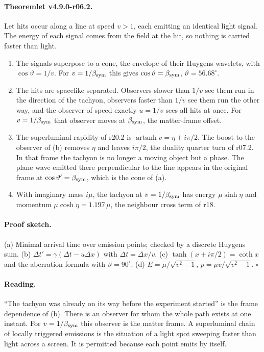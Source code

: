 \paragraph{Theoremlet v4.9.0-r06.2.}
Let hits occur along a line at speed \(v>1\), each emitting an identical light signal.  The energy of each signal comes
from the field at the hit, so nothing is carried faster than light.
\begin{enumerate}[leftmargin=2em]
\item[(a)] The signals superpose to a cone, the envelope of their Huygens wavelets, with \(\cos\vartheta=1/v\).  For
\(v=1/\beta_{\mathrm{sym}}\) this gives \(\cos\vartheta=\beta_{\mathrm{sym}}\), \(\vartheta=56.68^\circ\).
\item[(b)] The hits are spacelike separated.  Observers slower than \(1/v\) see them run in the direction of the
tachyon, observers faster than \(1/v\) see them run the other way, and the observer of speed exactly \(u=1/v\) sees all hits
at once.  For \(v=1/\beta_{\mathrm{sym}}\) that observer moves at \(\beta_{\mathrm{sym}}\), the matter-frame offset.
\item[(c)] The superluminal rapidity of r20.2 is \(\operatorname{artanh}v=\eta+i\pi/2\).  The boost to the observer of (b)
removes \(\eta\) and leaves \(i\pi/2\), the duality quarter turn of r07.2.  In that frame the tachyon is no longer a moving
object but a phase.  The plane wave emitted there perpendicular to the line appears in the original frame at
\(\cos\vartheta'=\beta_{\mathrm{sym}}\), which is the cone of (a).
\item[(d)] With imaginary mass \(i\mu\), the tachyon at \(v=1/\beta_{\mathrm{sym}}\) has energy \(\mu\sinh\eta\) and momentum
\(\mu\cosh\eta=1.197\,\mu\), the neighbour cross term of r18.
\end{enumerate}

\paragraph{Proof sketch.}
(a) Minimal arrival time over emission points; checked by a discrete Huygens sum.  (b)
\(\Delta t'=\gamma(\Delta t-u\Delta x)\) with \(\Delta t=\Delta x/v\).  (c) \(\tanh(x+i\pi/2)=\coth x\) and the aberration
formula with \(\vartheta=90^\circ\).  (d) \(E=\mu/\sqrt{v^2-1}\), \(p=\mu v/\sqrt{v^2-1}\).  \(\square\)

\paragraph{Reading.}
``The tachyon was already on its way before the experiment started'' is the frame dependence of (b).  There is an
observer for whom the whole path exists at one instant.  For \(v=1/\beta_{\mathrm{sym}}\) this observer is the matter frame.  A
superluminal chain of locally triggered emissions is the situation of a light spot sweeping faster than light across a
screen.  It is permitted because each point emits by itself.


